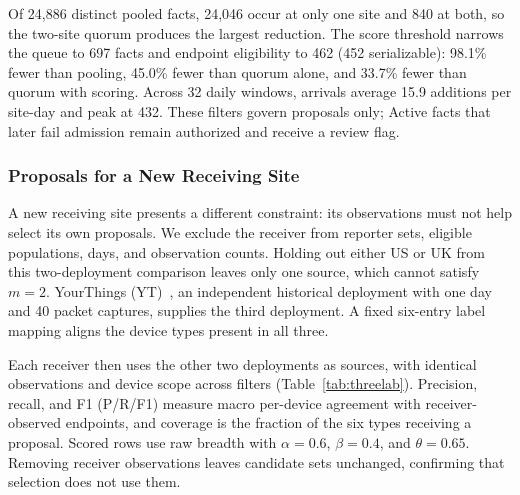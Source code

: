 \documentclass[journal]{IEEEtran}
\theoremstyle{definition}
\begin{document}
Of 24,886 distinct pooled facts, 24,046 occur at only one site and 840 at both, so the two-site quorum produces the largest reduction. The score threshold narrows the queue to 697 facts and endpoint eligibility to 462 (452 serializable): 98.1\% fewer than pooling, 45.0\% fewer than quorum alone, and 33.7\% fewer than quorum with scoring. Across 32 daily windows, arrivals average 15.9 additions per site-day and peak at 432. These filters govern proposals only; Active facts that later fail admission remain authorized and receive a review flag.

\subsubsection{Proposals for a New Receiving Site}
\label{sec:loo-results}

A new receiving site presents a different constraint: its observations must not help select its own proposals. We exclude the receiver from reporter sets, eligible populations, days, and observation counts. Holding out either US or UK from this two-deployment comparison leaves only one source, which cannot satisfy $m=2$. YourThings (YT)~\cite{alrawi2019yourthings}, an independent historical deployment with one day and 40 packet captures, supplies the third deployment. A fixed six-entry label mapping aligns the device types present in all three.

Each receiver then uses the other two deployments as sources, with identical observations and device scope across filters (Table~\ref{tab:threelab}). Precision, recall, and F1 (P/R/F1) measure macro per-device agreement with receiver-observed endpoints, and coverage is the fraction of the six types receiving a proposal. Scored rows use raw breadth with $\alpha=0.6$, $\beta=0.4$, and $\theta=0.65$. Removing receiver observations leaves candidate sets unchanged, confirming that selection does not use them.
\end{document}
